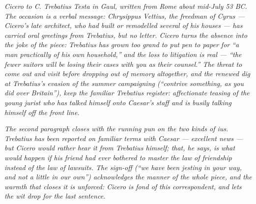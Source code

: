 
\textit{Cicero to C. Trebatius Testa in Gaul, written from Rome
about mid-July 53 BC. The occasion is a verbal message: Chrysippus
Vettius, the freedman of Cyrus --- Cicero's late architect, who
had built or remodelled several of his houses --- has carried oral
greetings from Trebatius, but no letter. Cicero turns the absence
into the joke of the piece: Trebatius has grown too grand to put
pen to paper for ``a man practically of his own household,'' and
the loss to litigation is real --- ``the fewer suitors will be
losing their cases with you as their counsel.'' The threat to
come out and visit before dropping out of memory altogether, and
the renewed dig at Trebatius's evasion of the summer campaigning
(``contrive something, as you did over Britain''), keep the
familiar Trebatius register: affectionate teasing of the young
jurist who has talked himself onto Caesar's staff and is busily
talking himself off the front line.}

\textit{The second paragraph closes with the running pun on the
two kinds of \textit{ius}. Trebatius has been reported on
familiar terms with Caesar --- excellent news --- but Cicero
would rather hear it from Trebatius himself; that, he says,
is what would happen if his friend had ever bothered to master
the law of friendship instead of the law of lawsuits. The
sign-off (``we have been jesting in your way, and not a little
in our own'') acknowledges the manner of the whole piece, and
the warmth that closes it is unforced: Cicero is fond of this
correspondent, and lets the wit drop for the last sentence.}
